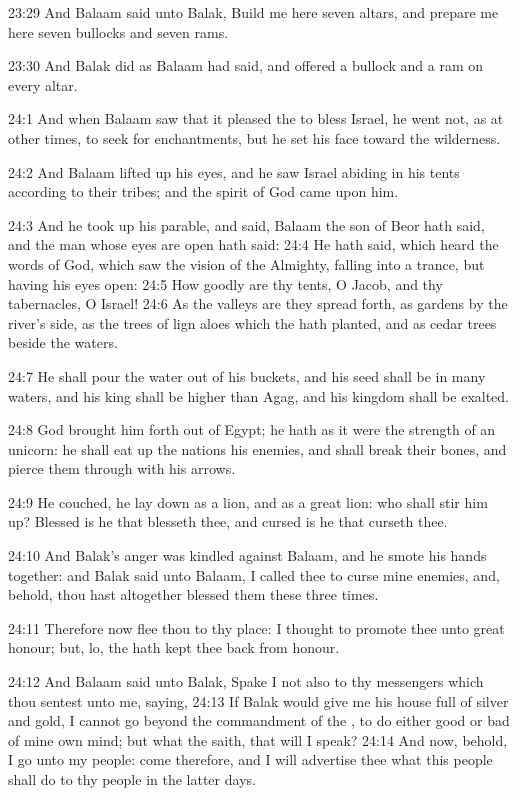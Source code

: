 23:29 And Balaam said unto Balak, Build me here seven altars, and
prepare me here seven bullocks and seven rams.

23:30 And Balak did as Balaam had said, and offered a bullock and a
ram on every altar.

24:1 And when Balaam saw that it pleased the \LORD to bless Israel, he
went not, as at other times, to seek for enchantments, but he set his
face toward the wilderness.

24:2 And Balaam lifted up his eyes, and he saw Israel abiding in his
tents according to their tribes; and the spirit of God came upon him.

24:3 And he took up his parable, and said, Balaam the son of Beor hath
said, and the man whose eyes are open hath said: 24:4 He hath said,
which heard the words of God, which saw the vision of the Almighty,
falling into a trance, but having his eyes open: 24:5 How goodly are
thy tents, O Jacob, and thy tabernacles, O Israel!  24:6 As the
valleys are they spread forth, as gardens by the river's side, as the
trees of lign aloes which the \LORD hath planted, and as cedar trees
beside the waters.

24:7 He shall pour the water out of his buckets, and his seed shall be
in many waters, and his king shall be higher than Agag, and his
kingdom shall be exalted.

24:8 God brought him forth out of Egypt; he hath as it were the
strength of an unicorn: he shall eat up the nations his enemies, and
shall break their bones, and pierce them through with his arrows.

24:9 He couched, he lay down as a lion, and as a great lion: who shall
stir him up? Blessed is he that blesseth thee, and cursed is he that
curseth thee.

24:10 And Balak's anger was kindled against Balaam, and he smote his
hands together: and Balak said unto Balaam, I called thee to curse
mine enemies, and, behold, thou hast altogether blessed them these
three times.

24:11 Therefore now flee thou to thy place: I thought to promote thee
unto great honour; but, lo, the \LORD hath kept thee back from honour.

24:12 And Balaam said unto Balak, Spake I not also to thy messengers
which thou sentest unto me, saying, 24:13 If Balak would give me his
house full of silver and gold, I cannot go beyond the commandment of
the \LORD, to do either good or bad of mine own mind; but what the \LORD
saith, that will I speak?  24:14 And now, behold, I go unto my people:
come therefore, and I will advertise thee what this people shall do to
thy people in the latter days.

